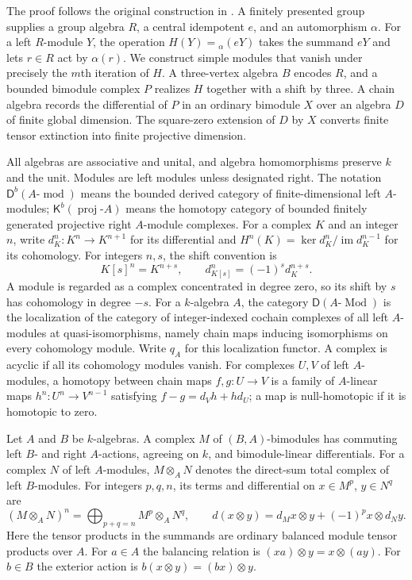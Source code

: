 \documentclass[11pt]{article}
\numberwithin{equation}{section}
\theoremstyle{definition}
\theoremstyle{remark}
\newcommand{\D}{\mathsf D}
\newcommand{\K}{\mathsf K}
\DeclareMathOperator{\proj}{proj}
\DeclareMathOperator{\Mod}{Mod}
\DeclareMathOperator{\modu}{mod}
\begin{document}
The proof follows the original construction in \cite{OpenAI198}.
A finitely presented group supplies a group algebra $R$, a central
idempotent $e$, and an automorphism $\alpha$. For a left $R$-module
$Y$, the operation $H(Y)={}_{\alpha}(eY)$ takes the summand $eY$ and lets
$r\in R$ act by $\alpha(r)$. We construct simple modules that vanish
under precisely the $m$th iteration of $H$.
A three-vertex algebra $B$ encodes $R$, and a bounded bimodule complex
$P$ realizes $H$ together with a shift by three.
A chain algebra records the differential of $P$ in an ordinary
bimodule $X$ over an algebra $D$ of finite global dimension.
The square-zero extension of $D$ by $X$ converts finite tensor
extinction into finite projective dimension.

All algebras are associative and unital, and algebra homomorphisms
preserve $k$ and the unit. Modules are left modules unless designated
right. The notation $\D^b(A\text{-}\modu)$ means the bounded derived
category of finite-dimensional left $A$-modules; $\K^b(\proj\text{-}A)$
means the homotopy category of bounded finitely generated projective
right $A$-module complexes. For a complex $K$ and an integer $n$, write
$d_K^n:K^n\to K^{n+1}$ for its
differential and $H^n(K)=\ker d_K^n/\operatorname{im}d_K^{n-1}$
for its cohomology. For integers $n,s$, the shift convention is
\[
K[s]^n=K^{n+s},\qquad d_{K[s]}^n=(-1)^s d_K^{n+s}.
\]
A module is regarded as a complex concentrated in degree zero, so
its shift by $s$ has cohomology in degree $-s$.
For a $k$-algebra $A$, the category $\D(A\text{-}\Mod)$ is the
localization of the category of integer-indexed cochain complexes of
all left $A$-modules at quasi-isomorphisms, namely chain maps inducing
isomorphisms on every cohomology module.  Write $q_A$ for this
localization functor.  A complex is acyclic if all its cohomology
modules vanish.  For complexes $U,V$ of left $A$-modules, a homotopy
between chain maps $f,g:U\to V$ is a family of $A$-linear maps $h^n:U^n\to V^{n-1}$ satisfying
$f-g=d_Vh+hd_U$; a map is null-homotopic if it is homotopic to zero.

Let $A$ and $B$ be $k$-algebras.  A complex $M$ of
$(B,A)$-bimodules has commuting left $B$- and right $A$-actions,
agreeing on $k$, and bimodule-linear differentials.  For a complex
$N$ of left $A$-modules, $M\otimes_A N$ denotes the direct-sum
total complex of left $B$-modules.  For integers $p,q,n$, its terms
and differential on $x\in M^p$, $y\in N^q$ are
\[
 (M\otimes_A N)^n=\bigoplus_{p+q=n}M^p\otimes_A N^q,
 \qquad
 d(x\otimes y)=d_Mx\otimes y+(-1)^p x\otimes d_Ny.
\]
Here the tensor products in the summands are ordinary balanced
module tensor products over $A$.  For $a\in A$ the balancing
relation is $(xa)\otimes y=x\otimes(ay)$.  For $b\in B$ the
exterior action is $b(x\otimes y)=(bx)\otimes y$.
\end{document}
